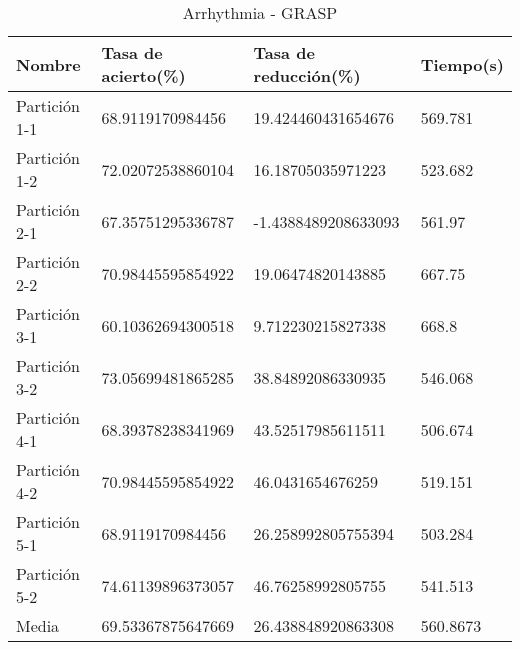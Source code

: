 \begin{table}[H]
	\centering
	\begin{tabular}{l|lll}
		Nombre        & Tasa de acierto(\%) & Tasa de reducción(\%) & Tiempo(s) \\ \hline
		Partición 1-1 & 68.9119170984456    & 19.424460431654676    & 569.781   \\
		Partición 1-2 & 72.02072538860104   & 16.18705035971223     & 523.682   \\
		Partición 2-1 & 67.35751295336787   & -1.4388489208633093   & 561.97    \\
		Partición 2-2 & 70.98445595854922   & 19.06474820143885     & 667.75    \\
		Partición 3-1 & 60.10362694300518   & 9.712230215827338     & 668.8     \\
		Partición 3-2 & 73.05699481865285   & 38.84892086330935     & 546.068   \\
		Partición 4-1 & 68.39378238341969   & 43.52517985611511     & 506.674   \\
		Partición 4-2 & 70.98445595854922   & 46.0431654676259      & 519.151   \\
		Partición 5-1 & 68.9119170984456    & 26.258992805755394    & 503.284   \\
		Partición 5-2 & 74.61139896373057   & 46.76258992805755     & 541.513   \\ \hline
		Media         & 69.53367875647669   & 26.438848920863308    & 560.8673
	\end{tabular}
	\caption{Arrhythmia - GRASP}
	\label{ARRH-GRASP}
\end{table}